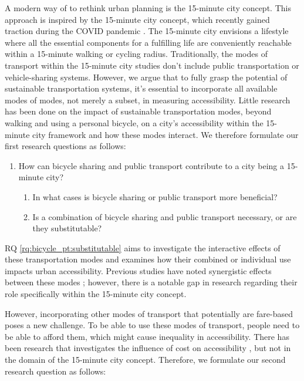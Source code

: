 A modern way of to rethink urban planning is the 15-minute city concept.
This approach is inspired by the 15-minute city concept, which recently gained traction during the COVID pandemic .
The 15-minute city envisions a lifestyle where all the essential components for a fulfilling life are conveniently reachable within a 15-minute walking or cycling radius.
Traditionally, the modes of transport within the 15-minute city studies don't include public transportation or vehicle-sharing systems.
However, we argue that to fully grasp the potential of sustainable transportation systems, it's essential to incorporate all available modes of modes, not merely a subset, in measuring accessibility.
Little research has been done on the impact of sustainable transportation modes, beyond walking and using a personal bicycle, on a city's accessibility within the 15-minute city framework and how these modes interact.
We therefore formulate our first research questions as follows:
\begin{enumerate}
  \renewcommand{\labelenumi}{RQ \theenumi.}
  \item How can bicycle sharing and public transport contribute to a city being a 15-minute city?
  \label{rq:bicycle_pt}
  \begin{enumerate}
    \item In what cases is bicycle sharing or public transport more beneficial?
    \label{rq:bicycle_pt:beneficial}
    \item Is a combination of bicycle sharing and public transport necessary, or are they substitutable?
    \label{rq:bicycle_pt:substitutable}
  \end{enumerate}
\end{enumerate}
RQ \ref{rq:bicycle_pt:substitutable} aims to investigate the interactive effects of these transportation modes and examines how their combined or individual use impacts urban accessibility. 
Previous studies have noted synergistic effects between these modes ; however, there is a notable gap in research regarding their role specifically within the 15-minute city concept.

However, incorporating other modes of transport that potentially are fare-based poses a new challenge.
To be able to use these modes of transport, people need to be able to afford them, which might cause inequality in accessibility.
There has been research that investigates the influence of cost on accessibility , but not in the domain of the 15-minute city concept.
Therefore, we formulate our second research question as follows:

